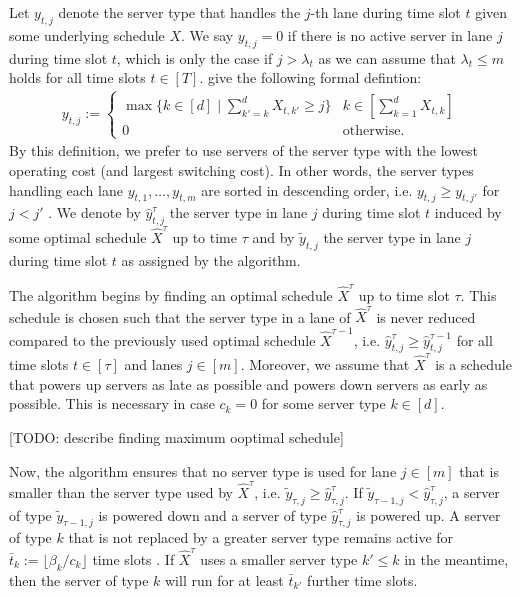 Let $y_{t,j}$ denote the server type that handles the $j$-th lane during time slot $t$ given some underlying schedule $X$. We say $y_{t,j} = 0$ if there is no active server in lane $j$ during time slot $t$, which is only the case if $j > \lambda_{t}$ as we can assume that $\lambda_{t} \leq m$ holds for all time slots $t \in [T]$. \citeauthor*{Albers2021} give the following formal defintion: \begin{align*}
    y_{t,j} := \begin{cases}
        \max \{k \in [d] \mid \sum_{k' = k}^d X_{t,k'} \geq j\} & k \in \left[\sum_{k=1}^d X_{t,k}\right] \\
        0 & \text{otherwise}.
    \end{cases}
\end{align*} By this definition, we prefer to use servers of the server type with the lowest operating cost (and largest switching cost). In other words, the server types handling each lane $y_{t,1}, \dots, y_{t,m}$ are sorted in descending order, i.e. $y_{t,j} \geq y_{t,j'}$ for $j < j'$ \cite{Albers2021}. We denote by $\hat{y}_{t,j}^{\tau}$ the server type in lane $j$ during time slot $t$ induced by some optimal schedule $\hat{X}^{\tau}$ up to time $\tau$ and by $\widetilde{y}_{t,j}$ the server type in lane $j$ during time slot $t$ as assigned by the algorithm.

The algorithm begins by finding an optimal schedule $\hat{X}^{\tau}$ up to time slot $\tau$. This schedule is chosen such that the server type in a lane of $\hat{X}^{\tau}$ is never reduced compared to the previously used optimal schedule $\hat{X}^{\tau-1}$, i.e. $\hat{y}_{t,j}^{\tau} \geq \hat{y}_{t,j}^{\tau-1}$ for all time slots $t \in [\tau]$ and lanes $j \in [m]$. Moreover, we assume that $\hat{X}^{\tau}$ is a schedule that powers up servers as late as possible and powers down servers as early as possible. This is necessary in case $c_k = 0$ for some server type $k \in [d]$.

[TODO: describe finding maximum ooptimal schedule]

Now, the algorithm ensures that no server type is used for lane $j \in [m]$ that is smaller than the server type used by $\hat{X}^{\tau}$, i.e. $\widetilde{y}_{\tau,j} \geq \hat{y}_{\tau,j}^{\tau}$. If $\widetilde{y}_{\tau-1,j} < \hat{y}_{\tau,j}^{\tau}$, a server of type $\widetilde{y}_{\tau-1,j}$ is powered down and a server of type $\hat{y}_{\tau,j}^{\tau}$ is powered up. A server of type $k$ that is not replaced by a greater server type remains active for $\bar{t}_k := \lfloor \beta_k / c_k \rfloor$ time slots \cite{Albers2021}. If $\hat{X}^{\tau}$ uses a smaller server type $k' \leq k$ in the meantime, then the server of type $k$ will run for at least $\bar{t}_{k'}$ further time slots.

